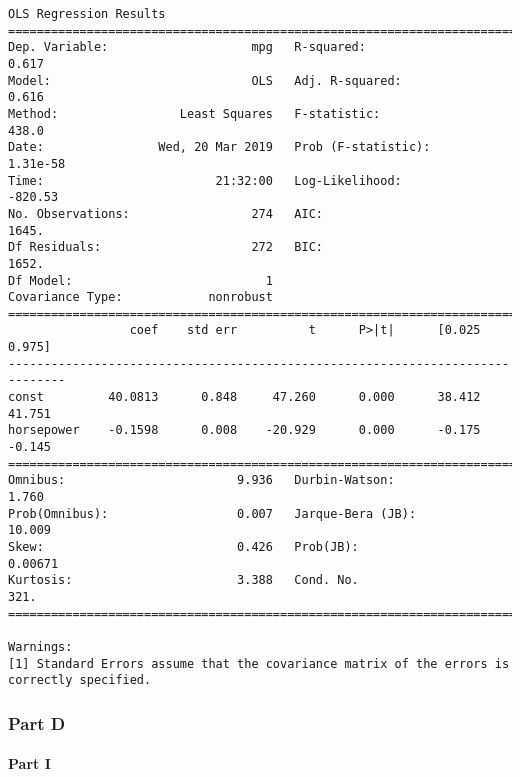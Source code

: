 \documentclass[11pt]{article}
\begin{document}
    \begin{Verbatim}[commandchars=\\\{\}]
                            OLS Regression Results                            
==============================================================================
Dep. Variable:                    mpg   R-squared:                       0.617
Model:                            OLS   Adj. R-squared:                  0.616
Method:                 Least Squares   F-statistic:                     438.0
Date:                Wed, 20 Mar 2019   Prob (F-statistic):           1.31e-58
Time:                        21:32:00   Log-Likelihood:                -820.53
No. Observations:                 274   AIC:                             1645.
Df Residuals:                     272   BIC:                             1652.
Df Model:                           1                                         
Covariance Type:            nonrobust                                         
==============================================================================
                 coef    std err          t      P>|t|      [0.025      0.975]
------------------------------------------------------------------------------
const         40.0813      0.848     47.260      0.000      38.412      41.751
horsepower    -0.1598      0.008    -20.929      0.000      -0.175      -0.145
==============================================================================
Omnibus:                        9.936   Durbin-Watson:                   1.760
Prob(Omnibus):                  0.007   Jarque-Bera (JB):               10.009
Skew:                           0.426   Prob(JB):                      0.00671
Kurtosis:                       3.388   Cond. No.                         321.
==============================================================================

Warnings:
[1] Standard Errors assume that the covariance matrix of the errors is correctly specified.

    \end{Verbatim}

    \subsubsection*{Part D}\label{part-d}

\paragraph{Part I}\label{part-i}
\end{document}
